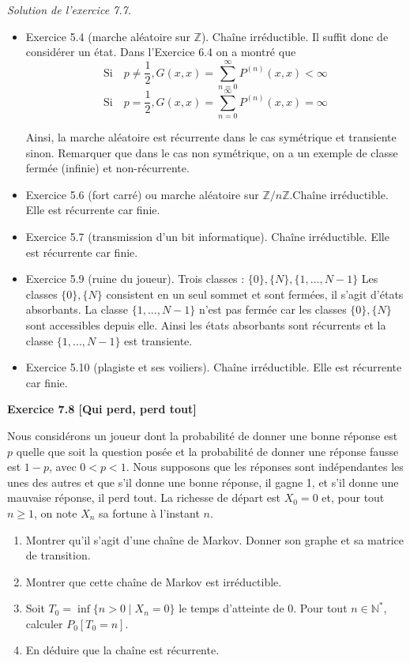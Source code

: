 \noindent \textit{Solution de l’exercice 7.7.}
\begin{itemize}
    \item Exercice 5.4 (marche aléatoire sur $\mathbb{Z}$). Chaîne irréductible. Il suffit donc de considérer un état. Dans l’Exercice 6.4 on a montré que
\[
\text{Si} \quad p \neq \frac{1}{2}, G(x, x) = \sum_{n=0}^{\infty}P^{(n)}(x,x) < \infty
\]
\[
\text{Si} \quad p = \frac{1}{2}, G(x, x) = \sum^{\infty}_{n=0}P^{(n)}(x, x) = \infty
\]

\noindent Ainsi, la marche aléatoire est récurrente dans le cas symétrique et transiente sinon. Remarquer que dans le cas non symétrique, on a un exemple de classe fermée (infinie) et non-récurrente.
    \item Exercice 5.6 (fort carré) ou marche aléatoire sur $\mathbb{Z}/n\mathbb{Z}$.Chaîne irréductible. Elle est récurrente car finie.
    \item Exercice 5.7 (transmission d’un bit informatique). Chaîne irréductible. Elle est récurrente car finie.
    \item Exercice 5.9 (ruine du joueur). Trois classes : $\{0\}, \{N\}, \{1,..., N-1\}$  Les classes $\{0\}, \{N\}$ consistent en un seul sommet et sont fermées, il s’agit d’états absorbants. La classe $\{1,..., N-1\}$ n’est pas fermée car les classes $\{0\}, \{N\}$ sont accessibles depuis elle. Ainsi les états absorbants sont récurrents et la classe $\{1,..., N-1\}$ est transiente.
    \item Exercice 5.10 (plagiste et ses voiliers). Chaîne irréductible. Elle est récurrente car finie.
\end{itemize}

\noindent \textbf{Exercice 7.8 [Qui perd, perd tout]}

Nous considérons un joueur dont la probabilité de donner une bonne réponse est $p$ quelle que soit la question posée et la probabilité de donner une réponse fausse est $1-p$, avec $0 < p < 1$. Nous supposons que les réponses sont indépendantes les unes des autres et que s’il donne une bonne réponse, il gagne 1, et s’il donne une mauvaise réponse, il perd tout. La richesse de départ est $X_0 = 0$ et, pour tout $n \geq 1$, on note $X_n$ sa fortune à l’instant $n$.
\begin{enumerate}
    \item Montrer qu’il s’agit d’une chaîne de Markov. Donner son graphe et sa matrice de transition.
    \item Montrer que cette chaîne de Markov est irréductible.
    \item Soit $T_0 = \inf\{n > 0 \mid X_n = 0\}$ le temps d’atteinte de $0$. Pour tout $n \in \mathbb{N}^*$, calculer $P_0[T_0 = n]$.
    \item En déduire que la chaîne est récurrente.
\end{enumerate}

